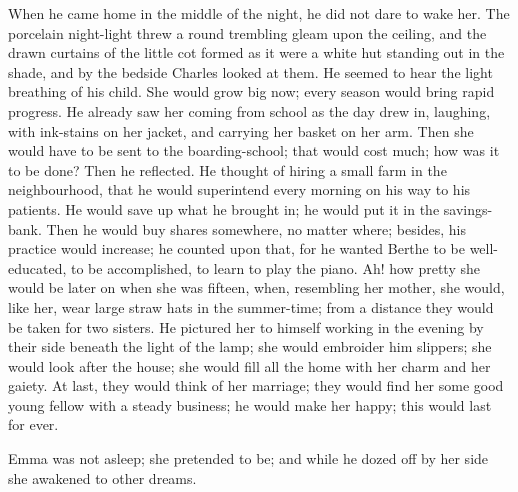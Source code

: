 \documentclass{tufte-book}
\begin{document}
When he came home in the middle of the night, he did not dare to wake
her. The porcelain night-light threw a round trembling gleam upon the
ceiling, and the drawn curtains of the little cot formed as it were a
white hut standing out in the shade, and by the bedside Charles looked
at them. He seemed to hear the light breathing of his child. She would
grow big now; every season would bring rapid progress. He already saw
her coming from school as the day drew in, laughing, with ink-stains on
her jacket, and carrying her basket on her arm. Then she would have to
be sent to the boarding-school; that would cost much; how was it to
be done? Then he reflected. He thought of hiring a small farm in the
neighbourhood, that he would superintend every morning on his way to his
patients. He would save up what he brought in; he would put it in the
savings-bank. Then he would buy shares somewhere, no matter where;
besides, his practice would increase; he counted upon that, for he
wanted Berthe to be well-educated, to be accomplished, to learn to play
the piano. Ah! how pretty she would be later on when she was fifteen,
when, resembling her mother, she would, like her, wear large straw hats
in the summer-time; from a distance they would be taken for two sisters.
He pictured her to himself working in the evening by their side beneath
the light of the lamp; she would embroider him slippers; she would look
after the house; she would fill all the home with her charm and her
gaiety. At last, they would think of her marriage; they would find her
some good young fellow with a steady business; he would make her happy;
this would last for ever.

Emma was not asleep; she pretended to be; and while he dozed off by her
side she awakened to other dreams.
\end{document}
